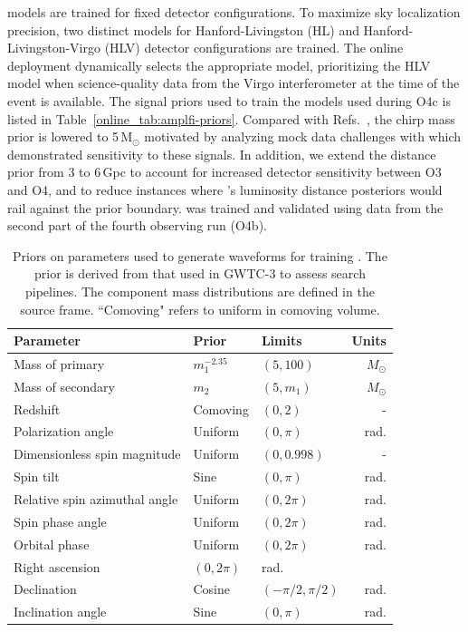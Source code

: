 \begin{refsection}
\amplfi models are trained for fixed detector configurations. 
To maximize sky localization precision, two distinct \amplfi models for Hanford-Livingston (HL) and Hanford-Livingston-Virgo (HLV) detector configurations are trained. 
The online deployment dynamically selects the appropriate model, prioritizing the HLV model when science-quality data from the Virgo interferometer at the time of the event is available. 
The signal priors used to train the \amplfi models used during O4c is listed in Table~\ref{online_tab:amplfi-priors}. 
Compared with Refs.~\cite{amplfi, Marx:2025ioo}, the chirp mass prior is lowered to 5\,$\mathrm{M}_{\odot}$ motivated by analyzing mock data challenges with \aframe which demonstrated sensitivity to these signals. 
In addition, we extend the distance prior from 3 to 6\,Gpc to account for increased detector sensitivity between O3 and O4, and to reduce instances where \amplfi's luminosity distance posteriors would rail against the prior boundary. 
\amplfi was trained and validated using data from the second part of the fourth observing run (O4b).

\begin{table}
\centering
\begin{tabular}{ lllr }
\hline
\hline
Parameter & Prior & Limits & Units\\
\hline
Mass of primary & $m_1^{-2.35}$ & $(5, 100)$ & $M_{\odot}$\\
Mass of secondary & $m_2$ & $(5, m_1)$ & $M_{\odot}$\\
Redshift & Comoving & $(0, 2)$ & -\\
Polarization angle & Uniform & $(0, \pi)$ & rad.\\
Dimensionless spin magnitude & Uniform & $(0, 0.998)$ & -\\
Spin tilt & Sine & $(0, \pi)$ & rad.\\
Relative spin azimuthal angle & Uniform & $(0, 2\pi)$ & rad.\\
Spin phase angle & Uniform & $(0, 2\pi)$ & rad.\\
Orbital phase & Uniform & $(0, 2\pi)$ & rad.\\
Right ascension & $(0, 2\pi)$ & rad.\\
Declination &Cosine & $(-\pi/2, \pi/2)$ & rad.\\
Inclination angle & Sine & $(0, \pi)$ & rad.\\
\hline
\hline
\end{tabular}
\caption[Training priors for the online \aframe model]{Priors on parameters used to generate waveforms for training \aframe. 
The prior is derived from that used in GWTC-3 to assess search pipelines. 
The component mass distributions are defined in the source frame. 
``Comoving" refers to uniform in comoving volume.}
\label{online_tab:aframe-priors}
\end{table}


\end{refsection}
